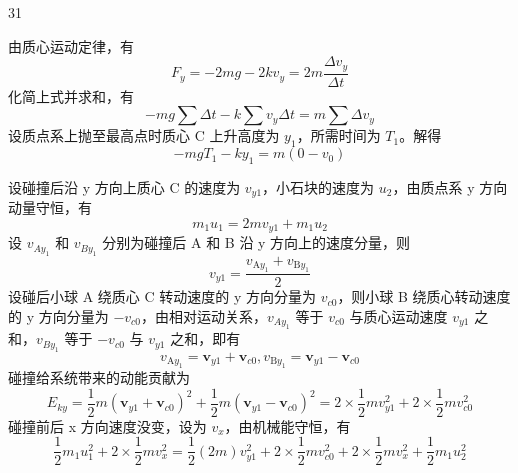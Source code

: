 \begin{solution}{31}
\begin{subsolution}
    \begin{subproblem}
      由质心运动定律，有
      \begin{equation}
        F_{y} = - 2 m g - 2 k v_{y} = 2 m \frac{\Delta v_{y}}{\Delta t}
        \label{eq:2.p31}
      \end{equation}
      化简上式并求和，有
      \begin{equation}
        - m g \sum \Delta t - k \sum v_{y} \Delta t = m \sum \Delta v_{y}
      \end{equation}
      设质点系上抛至最高点时质心 C 上升高度为 $y_{1}$，所需时间为 $T_{1}$。解得
      \begin{equation}
        - m g T_{1} - k y_{1} = m (0 - v_{0})
        \label{eq:3.p31}
      \end{equation}
    \end{subproblem}
    \begin{subproblem}[碰撞过程]
      设碰撞后沿 y 方向上质心 C 的速度为 $v_{y1}$，小石块的速度为 $u_{2}$，由质点系 y 方向动量守恒，有
      \begin{equation}
        m_{1} u_{1} = 2 m v_{y 1} + m_{1} u_{2}
        \label{eq:4.p31}
      \end{equation}
      设 $v_{Ay_{1}}$ 和 $v_{By_{1}}$ 分别为碰撞后 A 和 B 沿 y 方向上的速度分量，则
      \begin{equation}
        v_{y 1} = \frac{v_{\mathrm{A} y_{1}} + v_{\mathrm{B} y_{1}}}{2}
      \end{equation}
      设碰后小球 A 绕质心 C 转动速度的 y 方向分量为 $v_{c0}$，则小球 B 绕质心转动速度的 y 方向分量为 $-v_{c0}$，由相对运动关系，$v_{Ay_{1}}$ 等于 $v_{c0}$ 与质心运动速度 $v_{y1}$ 之和，$v_{By_{1}}$ 等于 $-v_{c0}$ 与 $v_{y1}$ 之和，即有
      \begin{equation}
        v_{\mathrm{A} y_{1}} = \boldsymbol{v}_{y 1} + \boldsymbol{v}_{c 0}, v_{\mathrm{B} y_{1}} = \boldsymbol{v}_{y 1} - \boldsymbol{v}_{c 0}
      \end{equation}
      碰撞给系统带来的动能贡献为
      \begin{equation}
        E_{k y} = \frac{1}{2} m (\boldsymbol{v}_{y 1} + \boldsymbol{v}_{c 0})^{2} + \frac{1}{2} m (\boldsymbol{v}_{y 1} - \boldsymbol{v}_{c 0})^{2} = 2 \times \frac{1}{2} m v_{y 1}^{2} + 2 \times \frac{1}{2} m v_{c 0}^{2}
      \end{equation}
      碰撞前后 x 方向速度没变，设为 $v_{x}$，由机械能守恒，有
      \begin{equation}
        \frac{1}{2} m_{1} u_{1}^{2} + 2 \times \frac{1}{2} m v_{x}^{2} = \frac{1}{2} (2 m) v_{y 1}^{2} + 2 \times \frac{1}{2} m v_{c 0}^{2} + 2 \times \frac{1}{2} m v_{x}^{2} + \frac{1}{2} m_{1} u_{2}^{2}

\end{equation}
\end{subproblem}
\end{subsolution}
\end{solution}
